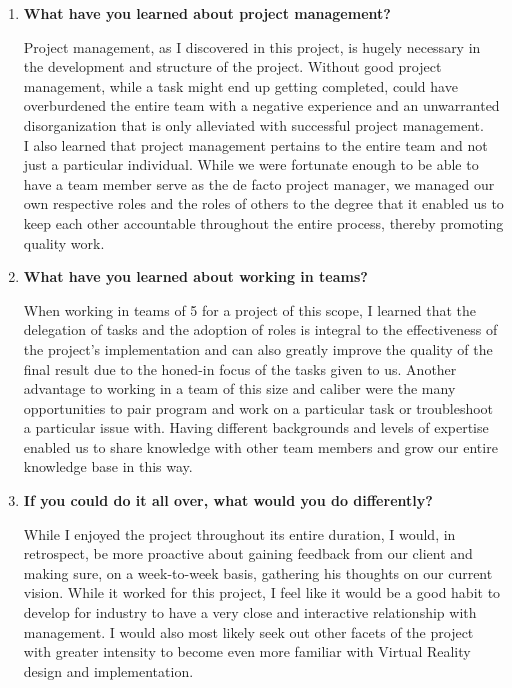 \documentclass[onecolumn, draftclsnofoot,10pt, compsoc]{IEEEtran}
\begin{document}
\begin{enumerate}
    \item \textbf{What have you learned about project management?}
    
    Project management, as I discovered in this project, is hugely necessary in the development and structure of the project. Without good project management, while a task might end up getting completed, could have overburdened the entire team with a negative experience and an unwarranted disorganization that is only alleviated with successful project management. 
    \\
    I also learned that project management pertains to the entire team and not just a particular individual. While we were fortunate enough to be able to have a team member serve as the de facto project manager, we managed our own respective roles and the roles of others to the degree that it enabled us to keep each other accountable throughout the entire process, thereby promoting quality work.
    
    \item \textbf{What have you learned about working in teams?}
    
    When working in teams of 5 for a project of this scope, I learned that the delegation of tasks and the adoption of roles is integral to the effectiveness of the project's implementation and can also greatly improve the quality of the final result due to the honed-in focus of the tasks given to us. Another advantage to working in a team of this size and caliber were the many opportunities to pair program and work on a particular task or troubleshoot a particular issue with. Having different backgrounds and levels of expertise enabled us to share knowledge with other team members and grow our entire knowledge base in this way.
    
    \item \textbf{If you could do it all over, what would you do differently?}
    
    While I enjoyed the project throughout its entire duration, I would, in retrospect, be more proactive about gaining feedback from our client and making sure, on a week-to-week basis, gathering his thoughts on our current vision. While it worked for this project, I feel like it would be a good habit to develop for industry to have a very close and interactive relationship with management. I would also most likely seek out other facets of the project with greater intensity to become even more familiar with Virtual Reality design and implementation.
    
\end{enumerate}
\end{document}
